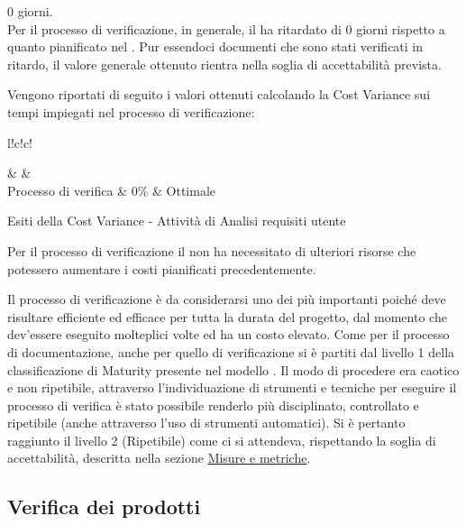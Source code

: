 \documentclass[a4paper, titlepage]{article}
\begin{document}
\begin{description}
\item{} 0 giorni.
\\Per il processo di verificazione, in generale, il  ha ritardato di 0 giorni rispetto a quanto pianificato nel . Pur essendoci documenti che sono stati verificati in ritardo, il valore generale ottenuto rientra nella soglia di accettabilità prevista.
\end{description}
\newpage
{}
Vengono riportati di seguito i valori ottenuti calcolando la Cost Variance sui tempi impiegati nel processo di verificazione:
\begin{tabella}{l!{\VRule}c!{\VRule}c!{\VRule}}
	
	\color{white}  & \color{white}  &\color{white}  \\
	\endfirsthead
	Processo di verifica & 0\% & Ottimale\\
	\caption{Esiti della Cost Variance - Attività di Analisi requisiti utente}	  
\end{tabella}

 Per il processo di verificazione il  non ha necessitato di ulteriori risorse che potessero aumentare i costi pianificati precedentemente.

Il processo di verificazione è da considerarsi uno dei più importanti poiché deve risultare efficiente ed efficace per tutta la durata del progetto, dal momento che dev'essere eseguito molteplici volte ed ha un costo elevato.
\newline Come per il processo di documentazione, anche per quello di verificazione si è partiti dal livello 1 della classificazione di Maturity presente nel modello . Il modo di procedere era caotico e non ripetibile, attraverso l'individuazione di strumenti e tecniche per eseguire il processo di verifica è stato possibile renderlo più disciplinato, controllato e ripetibile (anche attraverso l'uso di strumenti automatici).
\newline Si è pertanto raggiunto il livello 2 (Ripetibile) come ci si attendeva, rispettando la soglia di accettabilità, descritta nella sezione \hyperref[sec:metr]{Misure e metriche}.

\subsection{Verifica dei prodotti}
\end{document}
